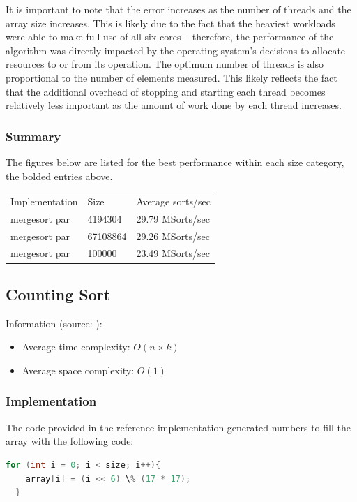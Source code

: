 \documentclass{article}
\begin{document}
It is important to note  that the error increases as the number
of threads and the array size increases. This is likely due to the fact that the heaviest
workloads were able to make full use of all six cores -- therefore,
the performance of the algorithm was directly impacted by the
operating system's decisions to allocate resources to or from its
operation. The optimum number of threads is also proportional to the
number of elements measured. This likely reflects the fact that the
additional overhead of stopping and starting each thread becomes
relatively less important as the amount of work done by each thread increases.

\subsubsection{Summary}
The figures below are listed for the best performance within each size
category, the bolded entries above.
\begin{center}
\begin{tabular}{lll}
 Implementation   & Size &  Average sorts/sec  \\
 mergesort par &     4194304   &  29.79 MSorts/sec \\
 mergesort par           &  67108864   &  29.26 MSorts/sec \\
 mergesort par           &  100000    &  23.49 MSorts/sec\\
\end{tabular}
\end{center}

\subsection{Counting Sort}
Information (source: \cite{Algos}):
\begin{itemize}
\item Average time complexity: $O(n \times k)$
\item Average space complexity: $O(1)$ 
\end{itemize}

\subsubsection{Implementation}

The code provided in the reference implementation generated numbers to
fill the array with the following code:
\begin{lstlisting}[language=C]
  for (int i = 0; i < size; i++){ 
    array[i] = (i << 6) \% (17 * 17);
  }
\end{lstlisting}
  
\end{document}
